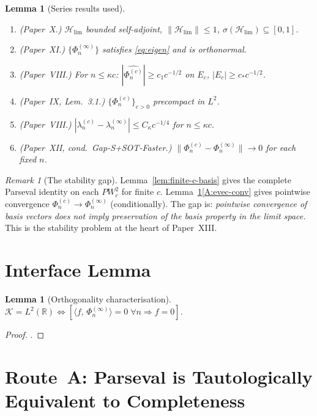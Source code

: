 \documentclass[12pt,a4paper]{amsart}
\newtheorem{lemma}[theorem]{Lemma}
\theoremstyle{definition}
\theoremstyle{remark}
\newtheorem{remark}[theorem]{Remark}
\newcommand{\norm}[1]{\|#1\|}
\newcommand{\ip}[2]{\langle #1,\, #2\rangle}
\newcommand{\Hlim}{\mathcal{H}_{\lim}}
\newcommand{\Phiinf}[1]{\Phi_{#1}^{(\infty)}}
\newcommand{\Phic}[2]{\Phi_{#2}^{(#1)}}
\newcommand{\lambdainf}[1]{\lambda_{#1}^{(\infty)}}
\newcommand{\lambdac}[2]{\lambda_{#2}^{(#1)}}
\newcommand{\PW}{PW}
\newcommand{\spc}[1]{\sigma(#1)}
\newcommand{\Kspace}{\mathcal{K}}
\begin{document}
\begin{lemma}[Series results used]
\label{lem:inherited}
\begin{enumerate}[\rm(A)]
\item\label{A:sa}
  \emph{(Paper~X.)} $\Hlim$ bounded self-adjoint,
  $\norm{\Hlim}\le 1$, $\spc{\Hlim}\subseteq[0,1]$.
\item\label{A:ONS}
  \emph{(Paper~XI.)} $\{\Phiinf{n}\}$ satisfies
  \eqref{eq:eigen} and is orthonormal.
\item\label{A:nonvanish}
  \emph{(Paper~VIII.)} For $n\le\kappa c$:
  $|\widehat{\Phic{c}{n}}|\ge c_1 c^{-1/2}$ on $E_c$,
  $|E_c|\ge c_* c^{-1/2}$.
\item\label{A:precompact}
  \emph{(Paper~IX, Lem.~3.1.)} $\{\Phic{c}{n}\}_{c>0}$
  precompact in $L^2$.
\item\label{A:eval-rate}
  \emph{(Paper~VIII.)} $|\lambdac{c}{n}-\lambdainf{n}|
  \le C_\kappa c^{-1/4}$ for $n\le\kappa c$.
\item\label{A:evec-conv}
  \emph{(Paper~XII, cond.~Gap-S+SOT-Faster.)}
  $\norm{\Phic{c}{n}-\Phiinf{n}}\to 0$ for each fixed $n$.
\end{enumerate}
\end{lemma}

\begin{remark}[The stability gap]
\label{rem:stability-gap}
Lemma~\ref{lem:finite-c-basis} gives the complete
Parseval identity on each $\PW_c^2$ for finite $c$.
Lemma~\ref{lem:inherited}\ref{A:evec-conv} gives
pointwise convergence $\Phic{c}{n}\to\Phiinf{n}$
(conditionally).
The gap is:
\emph{pointwise convergence of basis vectors does
not imply preservation of the basis property in the
limit space.}
This is the stability problem at the heart of Paper~XIII.
\end{remark}

\section{Interface Lemma}
\label{sec:interface}

\begin{lemma}[Orthogonality characterisation]
\label{lem:orth-char}
$\Kspace = L^2(\mathbb{R})\iff
[\ip{f}{\Phiinf{n}}=0\;\forall n\Rightarrow f=0]$.
\end{lemma}
\begin{proof}\cite[Thm.~3.3]{Conway1990}.\end{proof}

\section{Route~A: Parseval is Tautologically Equivalent
  to Completeness}
\label{sec:routeA}
\end{document}
